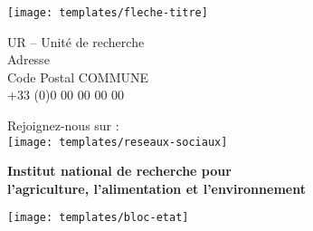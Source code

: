 \thispagestyle{empty}


\begin{center}

\color{inrae}

\vspace*{10cm}

\texttt{[image: templates/fleche-titre]}\par

\sffamily
UR -- Unité de recherche\\
Adresse\\
Code Postal COMMUNE\\
+33 (0)0 00 00 00 00\par\bigskip

Rejoignez-nous sur :\\
\texttt{[image: templates/reseaux-sociaux]}\par\bigskip

\vspace*{2cm}

{\bfseries Institut national de recherche pour\\
l'agriculture, l'alimentation et l'environnement}\par\bigskip

\texttt{[image: templates/bloc-etat]}\par

\end{center}

\restoregeometry
